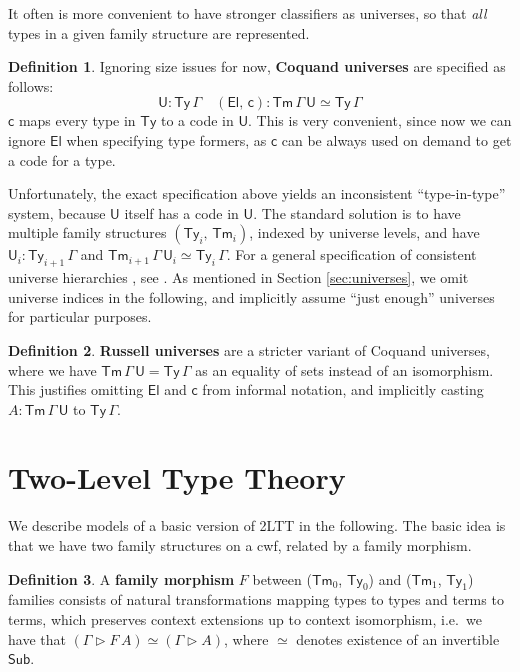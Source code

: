 \documentclass[12pt,a4paper,twoside,openany]{book}
\theoremstyle{remark}
\theoremstyle{definition}
\newtheorem{mydefinition}{Definition}
\newcommand{\ms}[1]{\mathsf{#1}}
\newcommand{\Sub}{\mathsf{Sub}}
\newcommand{\Tm}{\mathsf{Tm}}
\newcommand{\Ty}{\mathsf{Ty}}
\newcommand{\U}{\mathsf{U}}
\newcommand{\El}{\mathsf{El}}
\newcommand{\ext}{\triangleright}
\begin{document}
It often is more convenient to have stronger classifiers as universes, so that
\emph{all} types in a given family structure are represented.

\begin{mydefinition}
Ignoring size issues for now, \textbf{Coquand universes} \cite{TODO} are
specified as follows:
\[
  \U : \Ty\,\Gamma\hspace{1em} (\El,\,\ms{c}) : \Tm\,\Gamma\,\U \simeq \Ty\,\Gamma
\]
$\ms{c}$ maps every type in $\Ty$ to a code in $\U$. This is very convenient,
since now we can ignore $\El$ when specifying type formers, as $\ms{c}$ can be
always used on demand to get a code for a type.
\end{mydefinition}

Unfortunately, the exact specification above yields an inconsistent
``type-in-type'' system, because $\U$ itself has a code in $\U$. The standard
solution is to have multiple family structures $(\Ty_i,\,\Tm_i)$, indexed by
universe levels, and have $\U_i : \Ty_{i + 1}\,\Gamma$ and
$\Tm_{i+1}\,\Gamma\,\U_i \simeq \Ty_i\,\Gamma$. For a general specification of
consistent universe hierarchies , see \cite{TODO}. As mentioned in Section
\ref{sec:universes}, we omit universe indices in the following, and implicitly
assume ``just enough'' universes for particular purposes.

\begin{mydefinition}
\textbf{Russell universes} are a stricter variant of Coquand universes, where we
have $\Tm\,\Gamma\,\U = \Ty\,\Gamma$ as an equality of sets instead of an
isomorphism. This justifies omitting $\El$ and $\ms{c}$ from informal notation,
and implicitly casting $A : \Tm\,\Gamma\,\U$ to $\Ty\,\Gamma$.
\end{mydefinition}

\section{Two-Level Type Theory}

We describe models of a basic version of 2LTT in the following. The basic idea
is that we have two family structures on a cwf, related by a family morphism.

\begin{mydefinition}
A \textbf{family morphism} $F$ between ($\Tm_0$, $\Ty_0$) and ($\Tm_1$, $\Ty_1$)
families consists of natural transformations mapping types to types and terms to
terms, which preserves context extensions up to context isomorphism, i.e.\ we
have that $(\Gamma \ext F\,A) \simeq (\Gamma \ext A)$, where $\simeq$ denotes
existence of an invertible $\Sub$.
\end{mydefinition}
\end{document}
